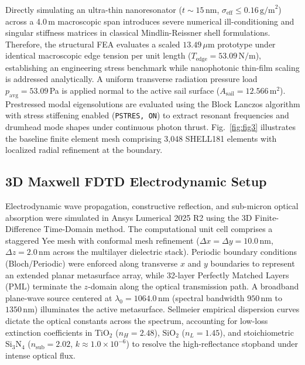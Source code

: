 \documentclass[aps,prd,reprint,superscriptaddress,nofootinbib,floatfix]{revtex4-2}
\begin{document}
Directly simulating an ultra-thin nanoresonator ($t \sim 15\,\mathrm{nm}$, $\sigma_{\mathrm{eff}} \le 0.16\,\mathrm{g/m}^2$) across a 4.0\,m macroscopic span introduces severe numerical ill-conditioning and singular stiffness matrices in classical Mindlin-Reissner shell formulations. Therefore, the structural FEA evaluates a scaled $13.49\,\mu\mathrm{m}$ prototype under identical macroscopic edge tension per unit length ($T_{\mathrm{edge}} = 53.09\,\mathrm{N/m}$), establishing an engineering stress benchmark while nanophotonic thin-film scaling is addressed analytically. A uniform transverse radiation pressure load $p_{\mathrm{avg}}=53.09$\,Pa is applied normal to the active sail surface ($A_{\mathrm{sail}}=12.566\,\mathrm{m}^2$). Prestressed modal eigensolutions are evaluated using the Block Lanczos algorithm with stress stiffening enabled (\texttt{PSTRES, ON}) to extract resonant frequencies and drumhead mode shapes under continuous photon thrust. Fig.~\ref{fig:fig3} illustrates the baseline finite element mesh comprising 3,048 SHELL181 elements with localized radial refinement at the boundary.





\subsection{3D Maxwell FDTD Electrodynamic Setup}
Electrodynamic wave propagation, constructive reflection, and sub-micron optical absorption were simulated in Ansys Lumerical 2025 R2 using the 3D Finite-Difference Time-Domain method. The computational unit cell comprises a staggered Yee mesh with conformal mesh refinement ($\Delta x = \Delta y = 10.0\,\mathrm{nm}$, $\Delta z = 2.0\,\mathrm{nm}$ across the multilayer dielectric stack). Periodic boundary conditions (Bloch/Periodic) were enforced along transverse $x$ and $y$ boundaries to represent an extended planar metasurface array, while 32-layer Perfectly Matched Layers (PML) terminate the $z$-domain along the optical transmission path. A broadband plane-wave source centered at $\lambda_0=1064.0\,\mathrm{nm}$ (spectral bandwidth $950\,\mathrm{nm}$ to $1350\,\mathrm{nm}$) illuminates the active metasurface. Sellmeier empirical dispersion curves dictate the optical constants across the spectrum, accounting for low-loss extinction coefficients in $\mathrm{TiO}_2$ ($n_H=2.48$), $\mathrm{SiO}_2$ ($n_L=1.45$), and stoichiometric $\mathrm{Si}_3\mathrm{N}_4$ ($n_{\mathrm{sub}}=2.02$, $k \approx 1.0\times 10^{-6}$) to resolve the high-reflectance stopband under intense optical flux.
\end{document}
